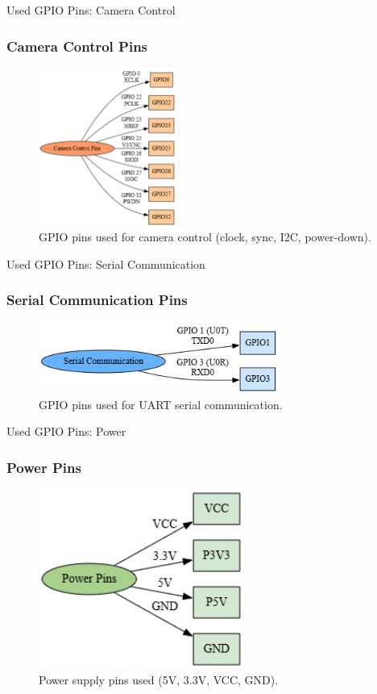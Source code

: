 \documentclass{beamer}
\begin{document}
\begin{frame}{Used GPIO Pins: Camera Control}
  \frametitle{Camera Control Pins}
  \begin{figure}
    \centering
    \includegraphics[width=0.40\textwidth]{camera_control_pins.png}
    \caption{GPIO pins used for camera control (clock, sync, I2C, power-down).}
  \end{figure}
\end{frame}

\begin{frame}{Used GPIO Pins: Serial Communication}
  \frametitle{Serial Communication Pins}
  \begin{figure}
    \centering
    \includegraphics[width=0.7\textwidth]{serial_comm.png}
    \caption{GPIO pins used for UART serial communication.}
  \end{figure}
\end{frame}

\begin{frame}{Used GPIO Pins: Power}
  \frametitle{Power Pins}
  \begin{figure}
    \centering
    \includegraphics[width=0.6\textwidth]{power_pins.png}
    \caption{Power supply pins used (5V, 3.3V, VCC, GND).}
  \end{figure}
\end{frame}
\end{document}
